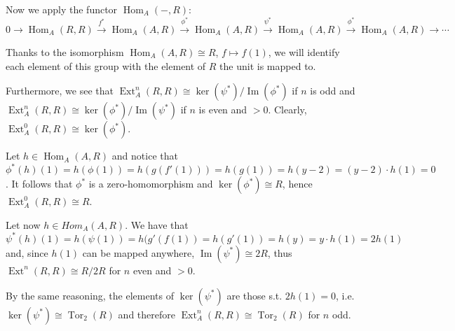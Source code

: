 \documentclass{article}
\DeclareMathOperator{\Hom}{Hom}
\DeclareMathOperator{\Ima}{Im}
\DeclareMathOperator{\Ext}{Ext}
\DeclareMathOperator{\Tor}{Tor}
\begin{document}
Now we apply the functor $\Hom_A(-,R)$:
$$0\rightarrow\Hom_A(R,R)\xrightarrow{f^*}\Hom_A(A,R)\xrightarrow{\phi^*}
\Hom_A(A,R)\xrightarrow{\psi^*}\Hom_A(A,R)\xrightarrow{\phi^*}
\Hom_A(A,R)\rightarrow\cdots$$

Thanks to the isomorphism $\Hom_A(A,R)\cong R$, $f\mapsto f(1)$, we will identify
each element of this group with the element of $R$ the unit is mapped to.

Furthermore, we see that $\Ext^n_A(R,R)\cong\ker(\psi^*)/\Ima(\phi^*)$ if $n$ is
odd and $\Ext^n_A(R,R)\cong\ker(\phi^*)/\Ima(\psi^*)$ if $n$ is even and $>0$. 
Clearly, $\Ext^0_A(R,R)\cong\ker(\phi^*)$.

Let $h\in\Hom_A(A,R)$ and notice that $\phi^*(h)(1)=h(\phi(1))=h(g(f'(1)))=
h(g(1))=h(y-2)=(y-2)\cdot h(1)=0$. It follows that $\phi^*$ is a zero-homomorphism
and $\ker(\phi^*)\cong R$, hence $\Ext^0_A(R,R)\cong R$.

Let now $h\in Hom_A(A,R)$. We have that $\psi^*(h)(1)=h(\psi(1))=h(g'(f(1))=
h(g'(1))=h(y)=y\cdot h(1)=2 h(1)$ and, since $h(1)$ can be mapped anywhere,
$\Ima(\psi^*)\cong 2R$, thus $\Ext^n(R,R)\cong R/2R$ for $n$ even and $>0$.

By the same reasoning, the elements of $\ker(\psi^*)$ are those s.t. $2h(1)=0$,
i.e. $\ker(\psi^*)\cong\Tor_2(R)$ and therefore $\Ext^n_A(R,R)\cong\Tor_2(R)$ for
$n$ odd.


\printbibliography
\end{document}

